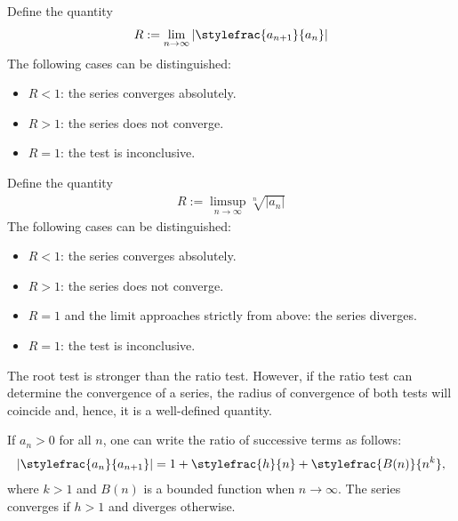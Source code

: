     \begin{method}
        Define the quantity
        \begin{gather}
            R := \lim_{n\rightarrow\infty}\left|\stylefrac{a_{n+1}}{a_n}\right|
        \end{gather}
        The following cases can be distinguished:
        \begin{itemize}
            \item $R<1$: the series converges absolutely.
            \item $R>1$: the series does not converge.
            \item $R=1$: the test is inconclusive.
        \end{itemize}
    \end{method}

    \begin{method}
        Define the quantity
        \begin{gather}
            R := \limsup_{n\rightarrow\infty}\sqrt[n]{|a_n|}
        \end{gather}
        The following cases can be distinguished:
        \begin{itemize}
            \item $R<1$: the series converges absolutely.
            \item $R>1$: the series does not converge.
            \item $R=1$ and the limit approaches strictly from above: the series diverges.
            \item $R=1$: the test is inconclusive.
        \end{itemize}
    \end{method}
    \begin{remark}
        The root test is stronger than the ratio test. However, if the ratio test can determine the convergence of a series, the radius of convergence of both tests will coincide and, hence, it is a well-defined quantity.
    \end{remark}

    \begin{method}
        If $a_n>0$ for all $n$, one can write the ratio of successive terms as follows:
        \begin{gather}
            \label{series:gauss_test}
            \left|\stylefrac{a_n}{a_{n+1}}\right| = 1 + \stylefrac{h}{n} + \stylefrac{B(n)}{n^k},
        \end{gather}
        where $k>1$ and $B(n)$ is a bounded function when $n\rightarrow\infty$. The series converges if $h>1$ and diverges otherwise.
    \end{method}

